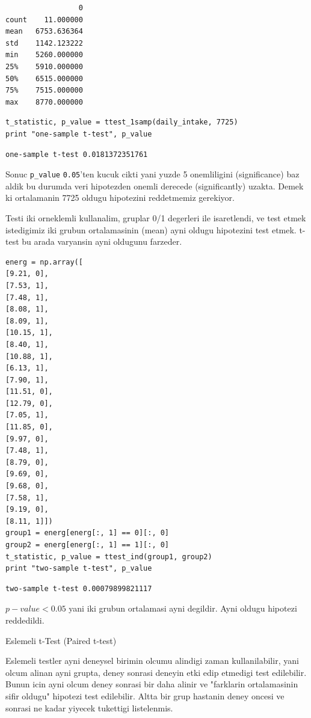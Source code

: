 \documentclass[12pt,fleqn]{article}\usepackage{../common}
\begin{document}
\begin{verbatim}
                 0
count    11.000000
mean   6753.636364
std    1142.123222
min    5260.000000
25%    5910.000000
50%    6515.000000
75%    7515.000000
max    8770.000000
\end{verbatim}

\begin{verbatim}
t_statistic, p_value = ttest_1samp(daily_intake, 7725)
print "one-sample t-test", p_value
\end{verbatim}

\begin{verbatim}
one-sample t-test 0.0181372351761
\end{verbatim}

Sonuc \verb!p_value! \verb!0.05!'ten kucuk cikti yani
yuzde 5 onemliligini (significance) baz aldik bu durumda veri
hipotezden onemli derecede (significantly) uzakta. Demek ki
ortalamanin 7725 oldugu hipotezini reddetmemiz gerekiyor.

Testi iki orneklemli kullanalim, gruplar 0/1 degerleri ile
isaretlendi, ve test etmek istedigimiz iki grubun ortalamasinin (mean)
ayni oldugu hipotezini test etmek. t-test bu arada varyansin ayni
oldugunu farzeder.

\begin{verbatim}
energ = np.array([
[9.21, 0],
[7.53, 1],
[7.48, 1],
[8.08, 1],
[8.09, 1],
[10.15, 1],
[8.40, 1],
[10.88, 1],
[6.13, 1],
[7.90, 1],
[11.51, 0],
[12.79, 0],
[7.05, 1],
[11.85, 0],
[9.97, 0],
[7.48, 1],
[8.79, 0],
[9.69, 0],
[9.68, 0],
[7.58, 1],
[9.19, 0],
[8.11, 1]])
group1 = energ[energ[:, 1] == 0][:, 0]
group2 = energ[energ[:, 1] == 1][:, 0]
t_statistic, p_value = ttest_ind(group1, group2)
print "two-sample t-test", p_value
\end{verbatim}

\begin{verbatim}
two-sample t-test 0.00079899821117
\end{verbatim}

$p-value < 0.05$ yani iki grubun ortalamasi ayni degildir. Ayni oldugu
hipotezi reddedildi.

Eslemeli t-Test (Paired t-test)

Eslemeli testler ayni deneysel birimin olcumu alindigi zaman
kullanilabilir, yani olcum alinan ayni grupta, deney sonrasi deneyin
etki edip etmedigi test edilebilir. Bunun icin ayni olcum deney
sonrasi bir daha alinir ve "farklarin ortalamasinin sifir oldugu"
hipotezi test edilebilir. Altta bir grup hastanin deney oncesi ve
sonrasi ne kadar yiyecek tukettigi listelenmis. 
\end{document}
